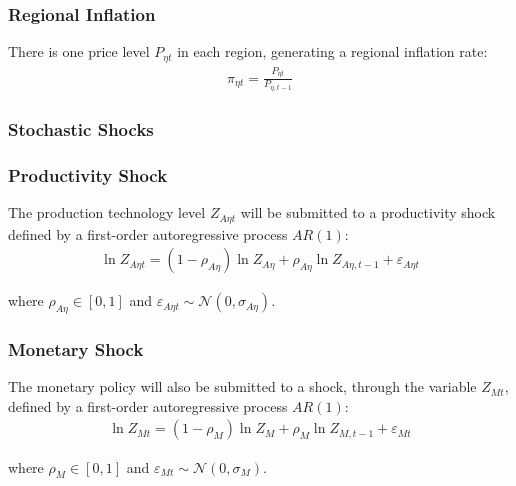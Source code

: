 \documentclass[../thesis.tex]{subfiles}
\begin{document}
\subsubsection*{Regional Inflation}

There is one price level $P_{\eta t}$ in each region, generating a regional inflation rate:
\begin{align}
	\pi_{\eta t} = \frac{P_{\eta t}}{P_{\eta, t-1}} \label{eq:regional-inflation}
\end{align}


\subsubsection{Stochastic Shocks}\label{sec:reg-stochastic-shocks}

\subsubsection*{Productivity Shock} \label{sec:reg-productivity-shock}

The production technology level $Z_{A\eta t}$ will be submitted to a productivity shock defined by a first-order autoregressive process $AR(1)$:
\begin{align}
	\ln{Z_{A\eta t}} = (1-\rho_{A\eta})\ln{Z_{A\eta}} + \rho_{A\eta}\ln{Z_{A\eta,t-1}} + \varepsilon_{A\eta t} \label{eq:reg-productivity-shock}
\end{align}

where $\rho_{A\eta} \in [0,1]$ and $\varepsilon_{A\eta t} \sim \mathscr{N}(0,\sigma_{A\eta})$.

\subsubsection*{Monetary Shock} \label{sec:reg-monetary-shock}

The monetary policy will also be submitted to a shock, through the variable $Z_{Mt}$, defined by a first-order autoregressive process $AR(1)$:
\begin{align}
	\ln{Z_{Mt}} = (1-\rho_M)\ln{Z_{M}} + \rho_M\ln{Z_{M,t-1}} + \varepsilon_{Mt} \label{eq:reg-monetary-shock}
\end{align}

where $\rho_M \in [0,1]$ and $\varepsilon_{Mt} \sim \mathscr{N}(0,\sigma_M)$.
\end{document}
